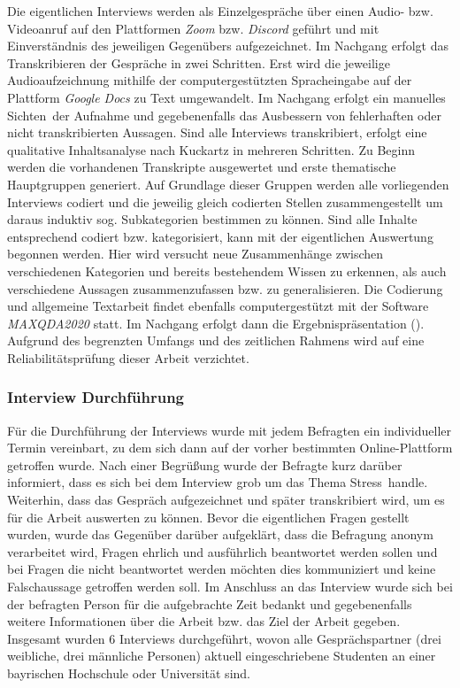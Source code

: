 \documentclass[10pt]{article}
\newcommand{\zit}[1]{(\cite{#1})}
\begin{document}
Die eigentlichen Interviews werden als Einzelgespräche über einen Audio- bzw. Videoanruf auf den Plattformen \textit{Zoom} bzw. \textit{Discord} geführt und mit Einverständnis des jeweiligen Gegenübers aufgezeichnet. 
Im Nachgang erfolgt das Transkribieren der Gespräche in zwei Schritten. Erst wird die jeweilige Audioaufzeichnung mithilfe der computergestützten Spracheingabe auf der Plattform \textit{Google Docs} zu Text umgewandelt. Im Nachgang erfolgt ein manuelles \grqq Sichten\grqq\ der Aufnahme und gegebenenfalls das Ausbessern von fehlerhaften oder nicht transkribierten Aussagen. 
Sind alle Interviews transkribiert, erfolgt eine qualitative Inhaltsanalyse nach Kuckartz in mehreren Schritten. Zu Beginn werden die vorhandenen Transkripte ausgewertet und erste thematische Hauptgruppen generiert. Auf Grundlage dieser Gruppen werden alle vorliegenden Interviews codiert und die jeweilig gleich codierten Stellen zusammengestellt um daraus induktiv sog. Subkategorien bestimmen zu können. Sind alle Inhalte entsprechend codiert bzw. kategorisiert, kann mit der eigentlichen Auswertung begonnen werden. Hier wird versucht neue Zusammenhänge zwischen verschiedenen Kategorien und bereits bestehendem Wissen zu erkennen, als auch verschiedene Aussagen zusammenzufassen bzw. zu generalisieren. Die Codierung und allgemeine Textarbeit findet ebenfalls computergestützt mit der Software \textit{MAXQDA2020} statt. Im Nachgang erfolgt dann die Ergebnispräsentation \zit{Inhaltsanalyse}. Aufgrund des begrenzten Umfangs und des zeitlichen Rahmens wird auf eine Reliabilitätsprüfung dieser Arbeit verzichtet.

\subsubsection{Interview Durchführung}
Für die Durchführung der Interviews wurde mit jedem Befragten ein individueller Termin vereinbart, zu dem sich dann auf der vorher bestimmten Online-Plattform getroffen wurde. Nach einer Begrüßung wurde der Befragte kurz darüber informiert, dass es sich bei dem Interview grob um das Thema  \grqq Stress\grqq\ handle. Weiterhin, dass das Gespräch aufgezeichnet und später transkribiert wird, um es für die Arbeit auswerten zu können. Bevor die eigentlichen Fragen gestellt wurden, wurde das Gegenüber darüber aufgeklärt, dass die Befragung anonym verarbeitet wird, Fragen ehrlich und ausführlich beantwortet werden sollen und bei Fragen die nicht beantwortet werden möchten dies kommuniziert und keine Falschaussage getroffen werden soll. Im Anschluss an das Interview wurde sich bei der befragten Person für die aufgebrachte Zeit bedankt und gegebenenfalls weitere Informationen über die Arbeit bzw. das Ziel der Arbeit gegeben.
Insgesamt wurden 6 Interviews durchgeführt, wovon alle Gesprächspartner (drei weibliche, drei männliche Personen) aktuell eingeschriebene Studenten an einer bayrischen Hochschule oder Universität sind. 
\end{document}
